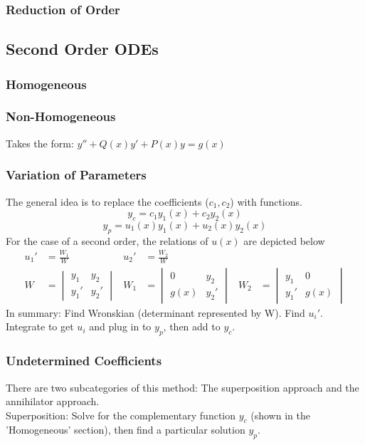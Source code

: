         \subsubsection{Reduction of Order}
\subsection{Second Order ODEs}
    \subsubsection{Homogeneous}
    \subsubsection{Non-Homogeneous}
        Takes the form: $y''+Q(x)y'+P(x)y=g(x)$
    \subsubsection{Variation of Parameters}
        The general idea is to replace the coefficients ($c_1,c_2$) with functions. 
        $$y_c=c_1y_1(x)+c_2y_2(x)$$
        $$y_p=u_1(x)y_1(x)+u_2(x)y_2(x)$$
        For the case of a second order, the relations of $u(x)$ are depicted below
        \begin{align*}
            u_1'&=\frac{W_1}{W} & u_2'&=\frac{W_2}{W}\\[0.7 cm]
            W&=
            \begin{vmatrix}
            y_1 & y_2 \\
            y_1'& y_2'
            \end{vmatrix}
            &
            W_1&=
            \begin{vmatrix}
            0 & y_2 \\
            g(x)& y_2'
            \end{vmatrix}
            &
            W_2&=
            \begin{vmatrix}
            y_1 & 0 \\
            y_1'& g(x)
            \end{vmatrix}
        \end{align*}
        In summary: Find Wronskian (determinant represented by W). Find $u_i'$. Integrate to get $u_i$ and plug in to $y_p$, then add to $y_c$.

    \subsubsection{Undetermined Coefficients}
        There are two subcategories of this method: The superposition approach and the annihilator approach.\\
        Superposition: Solve for the complementary function $y_c$ (shown in the 'Homogeneous' section), then find a particular solution $y_p$.
